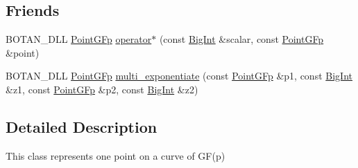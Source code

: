 \subsection*{Friends}
\begin{DoxyCompactItemize}
\item 
B\-O\-T\-A\-N\-\_\-\-D\-L\-L \hyperlink{classBotan_1_1PointGFp}{Point\-G\-Fp} \hyperlink{classBotan_1_1PointGFp_a4c9b210ee09efd2178e9cd56ea3c0189}{operator$\ast$} (const \hyperlink{classBotan_1_1BigInt}{Big\-Int} \&scalar, const \hyperlink{classBotan_1_1PointGFp}{Point\-G\-Fp} \&point)
\item 
B\-O\-T\-A\-N\-\_\-\-D\-L\-L \hyperlink{classBotan_1_1PointGFp}{Point\-G\-Fp} \hyperlink{classBotan_1_1PointGFp_afe7deb454d8a3132fbb6b7fff4023b11}{multi\-\_\-exponentiate} (const \hyperlink{classBotan_1_1PointGFp}{Point\-G\-Fp} \&p1, const \hyperlink{classBotan_1_1BigInt}{Big\-Int} \&z1, const \hyperlink{classBotan_1_1PointGFp}{Point\-G\-Fp} \&p2, const \hyperlink{classBotan_1_1BigInt}{Big\-Int} \&z2)
\end{DoxyCompactItemize}


\subsection{Detailed Description}
This class represents one point on a curve of G\-F(p) 

